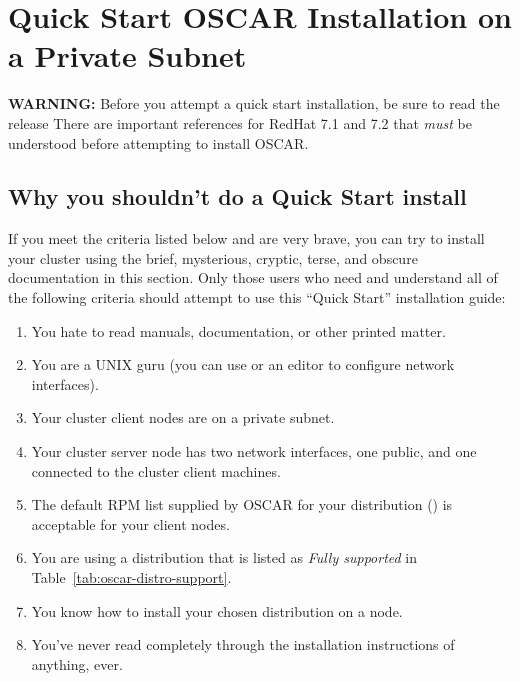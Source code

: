 %
%
%

\section{Quick Start OSCAR Installation on a Private Subnet}
\label{sec:quick-start}

\begchange

{\bf WARNING:} Before you attempt a quick start installation, be sure
to read the release   There are important references for RedHat 7.1 and 7.2
  that {\em must} be understood before attempting to install OSCAR.

\endchange


\subsection{Why you shouldn't do a Quick Start install}

If you meet the criteria listed below and are very brave, you can try
to install your cluster using the brief, mysterious, cryptic, terse,
and obscure documentation in this section.  Only those users who need
and understand all of the following criteria should attempt to use
this ``Quick Start'' installation guide:

\begin{enumerate}
\item You hate to read manuals, documentation, or other printed
  matter.
\item You are a UNIX guru (you can use  or an editor to
  configure network interfaces).
\item Your cluster client nodes are on a private subnet.
\item Your cluster server node has two network interfaces, one
  public, and one connected to the cluster client machines.
\item The default RPM list supplied by OSCAR for your distribution
  ()
  is acceptable for your client nodes.
\item You are using a distribution that is listed as \emph{Fully
    supported} in Table~\ref{tab:oscar-distro-support}.
\item You know how to install your chosen distribution on a node.
\item You've never read completely through the installation
  instructions of anything, ever.
\end{enumerate}

